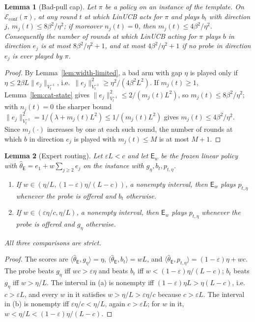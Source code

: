 \documentclass{article}
\newtheorem{lemma}{Lemma}
\theoremstyle{definition}
\theoremstyle{remark}
\newcommand{\eps}{\varepsilon}
\theoremstyle{remark}
\newcommand{\Exp}{\mathsf{E}}
\begin{document}
\begin{lemma}[Bad-pull cap]
\label{lem:cat-cap}
Let $\pi$ be a policy on an instance of the template. On
$\mathcal E_{\mathrm{conf}}(\pi)$, at any round $t$ at which LinUCB acts for
$\pi$ and plays $b_t$ with direction $j$, $m_j(t)\le8\beta^2/\eta^2$; if
moreover $n_j(t)=0$, then $m_j(t)\le4\beta^2/\eta^2$. Consequently the number
of rounds at which LinUCB acting for $\pi$ plays $b$ in direction $e_j$ is at
most $8\beta^2/\eta^2+1$, and at most $4\beta^2/\eta^2+1$ if no probe in
direction $e_j$ is ever played by $\pi$.
\end{lemma}

\begin{proof}
By Lemma~\ref{lem:width-limited}, a bad arm with gap $\eta$ is played only if
$\eta\le2\beta L\|e_j\|_{V_t^{-1}}$, i.e.\ $\|e_j\|^2_{V_t^{-1}}\ge\eta^2/(4\beta^2L^2)$.
If $m_j(t)\ge1$, Lemma~\ref{lem:cat-state} gives $\|e_j\|^2_{V_t^{-1}}\le2/(m_j(t)L^2)$,
so $m_j(t)\le8\beta^2/\eta^2$; with $n_j(t)=0$ the sharper bound
$\|e_j\|^2_{V_t^{-1}}=1/(\lambda+m_j(t)L^2)\le1/(m_j(t)L^2)$ gives $m_j(t)\le4\beta^2/\eta^2$.
Since $m_j(\cdot)$ increases by one at each such round, the number of rounds
at which $b$ in direction $e_j$ is played with $m_j(t)\le M$ is at most $M+1$.
\end{proof}

\begin{lemma}[Expert routing]
\label{lem:expert-routes}
Let $\eps L<c$ and let $\Exp_w$ be the frozen linear policy with
$\widehat\theta_{\Exp}=e_1+w\sum_{j\ge2}e_j$ on the instance with $g_\eta,b_t,p_{t,\eta}$.
\begin{enumerate}[itemsep=1pt,topsep=1pt,leftmargin=*]
\item[(a)] If $w\in(\eta/L,(1-\eps)\eta/(L-c))$, a nonempty interval, then
$\Exp_w$ plays $p_{t,\eta}$ whenever the probe is offered and $b_t$ otherwise.
\item[(b)] If $w\in(\eps\eta/c,\eta/L)$, a nonempty interval, then $\Exp_w$ plays
$p_{t,\eta}$ whenever the probe is offered and $g_\eta$ otherwise.
\end{enumerate}
All three comparisons are strict.
\end{lemma}

\begin{proof}
The scores are $\langle\widehat\theta_{\Exp},g_\eta\rangle=\eta$,
$\langle\widehat\theta_{\Exp},b_t\rangle=wL$, and
$\langle\widehat\theta_{\Exp},p_{t,\eta}\rangle=(1-\eps)\eta+wc$. The probe beats
$g_\eta$ iff $wc>\eps\eta$ and beats $b_t$ iff $w<(1-\eps)\eta/(L-c)$; $b_t$
beats $g_\eta$ iff $w>\eta/L$. The interval in (a) is nonempty iff
$(1-\eps)\eta L>\eta(L-c)$, i.e.\ $c>\eps L$, and every $w$ in it satisfies
$w>\eta/L>\eps\eta/c$ because $c>\eps L$. The interval in (b) is nonempty iff
$\eps\eta/c<\eta/L$, again $c>\eps L$; for $w$ in it, $w<\eta/L<(1-\eps)\eta/(L-c)$.
\end{proof}
\end{document}
